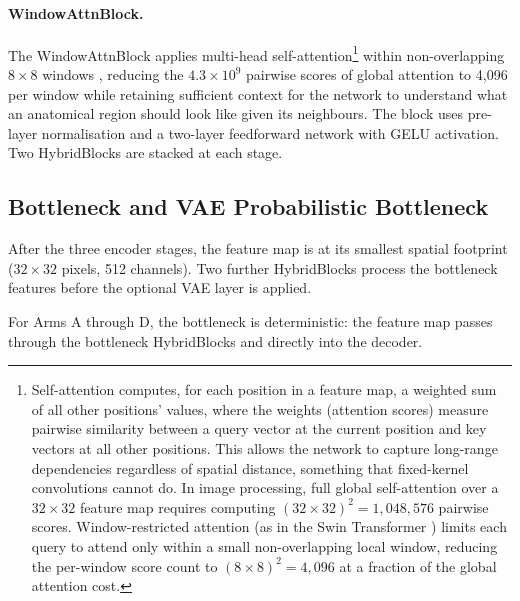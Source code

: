 \documentclass[12pt, a4paper, twoside, openright]{book}
\begin{document}
\paragraph{WindowAttnBlock.}
The WindowAttnBlock applies multi-head self-attention\footnote{Self-attention \cite{vaswani_attention_2017} computes, for each position in a feature map, a weighted sum of all other positions' values, where the weights (attention scores) measure pairwise similarity between a query vector at the current position and key vectors at all other positions. This allows the network to capture long-range dependencies regardless of spatial distance, something that fixed-kernel convolutions cannot do. In image processing, full global self-attention over a $32\times32$ feature map requires computing $(32\times32)^2 = 1,048,576$ pairwise scores. Window-restricted attention (as in the Swin Transformer \cite{liu_swin_2021}) limits each query to attend only within a small non-overlapping local window, reducing the per-window score count to $(8\times8)^2 = 4,096$ at a fraction of the global attention cost.} within non-overlapping $8\times8$ windows \cite{liu_swin_2021}, reducing the $4.3\times10^9$ pairwise scores of global attention to 4,096 per window while retaining sufficient context for the network to understand what an anatomical region should look like given its neighbours. The block uses pre-layer normalisation and a two-layer feedforward network with GELU activation. Two HybridBlocks are stacked at each stage.



\subsection{Bottleneck and VAE Probabilistic Bottleneck}
\label{sec:methods:architecture:bottleneck}

After the three encoder stages, the feature map is at its smallest spatial footprint
($32 \times 32$ pixels, 512 channels). Two further HybridBlocks process the bottleneck
features before the optional VAE layer is applied.

For Arms A through D, the bottleneck is deterministic: the feature
map passes through the bottleneck HybridBlocks and directly into the decoder.
\end{document}
